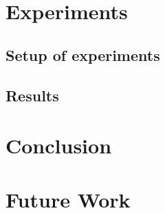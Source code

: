 \documentclass{ba-kecs}
\numberwithin{figure}{section}
\numberwithin{equation}{section}
\begin{document}
\section{Experiments}
\subsection{Setup of experiments}
\subsection{Results}

\section{Conclusion}

\section{Future Work}




\begin{thebibliography}{99}


\end{thebibliography}

\appendix
\end{document}
